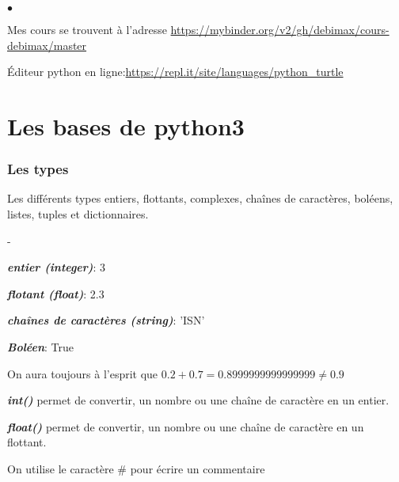 \documentclass[10pt,dvipsnames,  dvips]{article}
\begin{document}




\begin{list}{$\bullet$}{}
\item  Mes cours se trouvent à l'adresse \url{https://mybinder.org/v2/gh/debimax/cours-debimax/master}
\item Éditeur python en ligne:\url{https://repl.it/site/languages/python_turtle}
\end{list}

\section{Les bases de python3}

\subsubsection*{Les types}

Les différents types entiers, flottants, complexes, chaînes de caractères, boléens, listes, tuples et dictionnaires.



\begin{list}{-}{}
\item \textbf{\textit{entier (integer)}}: 3
\item \textbf{\textit{flotant (float)}}: 2.3
\item \textbf{\textit{chaînes de caractères (string)}}: 'ISN'
\item \textbf{\textit{Boléen}}: True

\item  On aura toujours à l'esprit que $0.2+0.7=0.8999999999999999\neq 0.9$

 \item \textbf{\textit{int()}} permet de convertir, un nombre ou une chaîne de caractère en un entier.

 \item \textbf{\textit{float()}} permet de convertir, un nombre ou une chaîne de caractère en un flottant.
\item On utilise le caractère \# pour écrire un commentaire 
\end{list}
\end{document}
